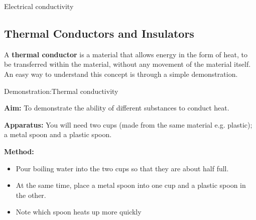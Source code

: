 \begin{iexperiment}{Electrical conductivity}
            \subsection{ Thermal Conductors and Insulators}
            \nopagebreak
      \label{m38706*id66527}A \textbf{thermal conductor} is a material that allows energy in the form of heat, to be transferred within the material, without any movement of the material itself. An easy way to understand this concept is through a simple demonstration.\par 
\label{m38706*secfhsst!!!underscore!!!id453}
            \begin{gexperiment}{Demonstration:Thermal conductivity}{
            \nopagebreak
            \label{m38706*id66568}\noindent{}\textbf{Aim: }\newline
    To demonstrate the ability of different substances to conduct heat.\par 
      \label{m38706*id66588}\noindent{}\textbf{Apparatus: }\newline
    You will need two cups (made from the same material e.g. plastic); a metal spoon and a plastic spoon.\par 
	\begin{figure}[H] %
    \begin{center}
    \end{center}
 \end{figure} 
      \label{m38706*id66592}\noindent{}\textbf{Method: }
      \label{m38706*id66609}\begin{itemize}[noitemsep]
            \label{m38706*uid102}\item Pour boiling water into the two cups so that they are about half full.
\label{m38706*uid103}\item At the same time, place a metal spoon into one cup and a plastic spoon in the other.
\label{m38706*uid104}\item Note which spoon heats up more quickly

\end{itemize}}
\end{gexperiment}
\end{iexperiment}
